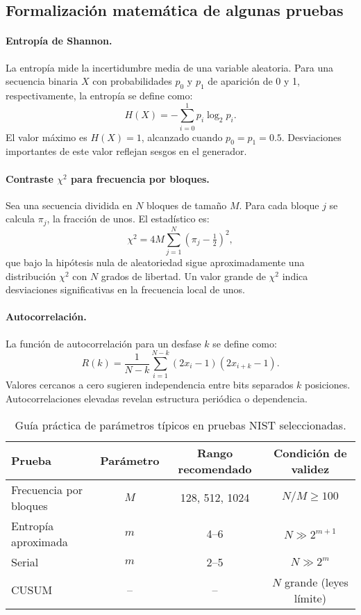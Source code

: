 \subsection*{Formalización matemática de algunas pruebas}

\paragraph{Entropía de Shannon.}
La entropía mide la incertidumbre media de una variable aleatoria. Para una
secuencia binaria $X$ con probabilidades $p_0$ y $p_1$ de aparición de 0 y 1,
respectivamente, la entropía se define como:
\[
H(X) = -\sum_{i=0}^{1} p_i \log_2 p_i.
\]
El valor máximo es $H(X)=1$, alcanzado cuando $p_0 = p_1 = 0.5$. Desviaciones
importantes de este valor reflejan sesgos en el generador.

\paragraph{Contraste $\chi^2$ para frecuencia por bloques.}
Sea una secuencia dividida en $N$ bloques de tamaño $M$. Para cada bloque $j$
se calcula $\pi_j$, la fracción de unos. El estadístico es:
\[
\chi^2 = 4M \sum_{j=1}^{N} \left(\pi_j - \tfrac{1}{2}\right)^2,
\]
que bajo la hipótesis nula de aleatoriedad sigue aproximadamente una distribución
$\chi^2$ con $N$ grados de libertad. Un valor grande de $\chi^2$ indica
desviaciones significativas en la frecuencia local de unos.

\paragraph{Autocorrelación.}
La función de autocorrelación para un desfase $k$ se define como:
\[
R(k) = \frac{1}{N-k}\sum_{i=1}^{N-k} (2x_i-1)(2x_{i+k}-1).
\]
Valores cercanos a cero sugieren independencia entre bits separados $k$
posiciones. Autocorrelaciones elevadas revelan estructura periódica o dependencia.

\begin{table}[h]
\centering
\begin{tabular}{lccc}
\toprule
Prueba & Parámetro & Rango recomendado & Condición de validez \\
\midrule
Frecuencia por bloques & $M$ & 128, 512, 1024 & $N/M \ge 100$ \\
Entropía aproximada & $m$ & 4--6 & $N \gg 2^{m+1}$ \\
Serial & $m$ & 2--5 & $N \gg 2^{m}$ \\
CUSUM & -- & -- & $N$ grande (leyes límite) \\
\bottomrule
\end{tabular}
\caption{Guía práctica de parámetros típicos en pruebas NIST seleccionadas.}
\end{table}


